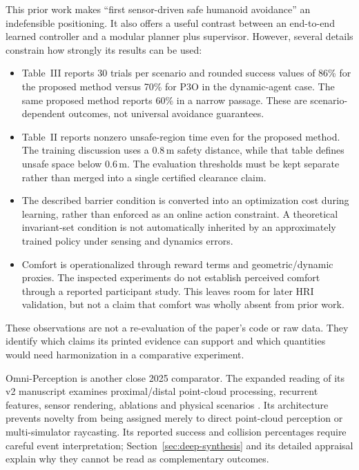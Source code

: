 \documentclass[11pt,a4paper]{article}
\begin{document}
This prior work makes ``first sensor-driven safe humanoid avoidance'' an
indefensible positioning. It also offers a useful contrast between an
end-to-end learned controller and a modular planner plus supervisor.
However, several details constrain how strongly its results can be used:
\begin{itemize}
\item Table~III reports 30 trials per scenario and rounded success values of
86\% for the proposed method versus 70\% for P3O in the dynamic-agent case.
The same proposed method reports 60\% in a narrow passage. These are
scenario-dependent outcomes, not universal avoidance guarantees.
\item Table~II reports nonzero unsafe-region time even for the proposed
method. The training discussion uses a 0.8\,m safety distance, while that
table defines unsafe space below 0.6\,m. The evaluation thresholds must be
kept separate rather than merged into a single certified clearance claim.
\item The described barrier condition is converted into an optimization
cost during learning, rather than enforced as an online action constraint.
A theoretical invariant-set condition is not automatically inherited by
an approximately trained policy under sensing and dynamics errors.
\item Comfort is operationalized through reward terms and geometric/dynamic
proxies. The inspected experiments do not establish perceived comfort
through a reported participant study. This leaves room for later HRI
validation, but not a claim that comfort was wholly absent from prior work.
\end{itemize}

These observations are not a re-evaluation of the paper's code or raw data.
They identify which claims its printed evidence can support and which
quantities would need harmonization in a comparative experiment.

Omni-Perception is another close 2025 comparator. The expanded reading of its
v2 manuscript examines proximal/distal point-cloud processing, recurrent features,
sensor rendering, ablations and physical scenarios \citep{omni}. Its architecture
prevents novelty from being assigned merely to direct point-cloud perception or
multi-simulator raycasting. Its reported success and collision percentages require
careful event interpretation; Section~\ref{sec:deep-synthesis} and its detailed
appraisal explain why they cannot be read as complementary outcomes.
\end{document}
